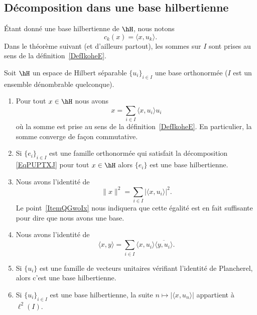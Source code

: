 \subsection{Décomposition dans une base hilbertienne}

Étant donné une base hilbertienne de \( \hH\), nous notons
\begin{equation}
	c_k(x)=\langle x, u_k\rangle .
\end{equation}
Dans le théorème suivant (et d'ailleurs partout), les sommes sur \( I\) sont prises au sens de la définition~\ref{DefIkoheE}.


\begin{theorem}     \label{ThoyAjoqP}
	Soit \( \hH\) un espace de Hilbert séparable \( \{ u_i \}_{i\in I}\) une base orthonormée (\( I\) est un ensemble dénombrable quelconque).

	\begin{enumerate}
		\item \label{ItemQGwoIxi}
		      Pour tout \( x\in \hH\) nous avons
		      \begin{equation}        \label{EqPUPTXJ}
			      x=\sum_{i\in I}\langle x, u_i\rangle u_i
		      \end{equation}
		      où la somme est prise au sens de la définition~\ref{DefIkoheE}. En particulier, la somme converge de façon commutative.

		\item

		      Si \( \{ e_i \}_{i\in I}\) est une famille orthonormée qui satisfait la décomposition \eqref{EqPUPTXJ} pour tout \( x\in \hH\) alors \( \{ e_i \}\) est une base hilbertienne.
		\item
		      Nous avons l'identité de 
		      \begin{equation}
			      \| x \|^2=\sum_{i\in I}| \langle x, u_i\rangle  |^2.
		      \end{equation}
		      Le point~\ref{ItemQGwoIx} nous indiquera que cette égalité est en fait suffisante pour dire que nous avons une base.
		\item
		      Nous avons l'identité de 
		      \begin{equation}    \label{EqHZxjtKt}
			      \langle x, y\rangle =\sum_{i\in I}\langle x, u_i\rangle \overline{ \langle y, u_i\rangle  }.
		      \end{equation}
		\item   \label{ItemQGwoIx}
		      Si \( \{ u_i \}\) est une famille de vecteurs unitaires vérifiant l'identité de Plancherel, alors c'est une base hilbertienne.
		\item
		      Si \( \{ u_i \}_{i\in I}\) est une base hilbertienne, la suite \( n\mapsto| \langle x, u_n\rangle  |\) appartient à \( \ell^2(I)\).
	\end{enumerate}
\end{theorem}

